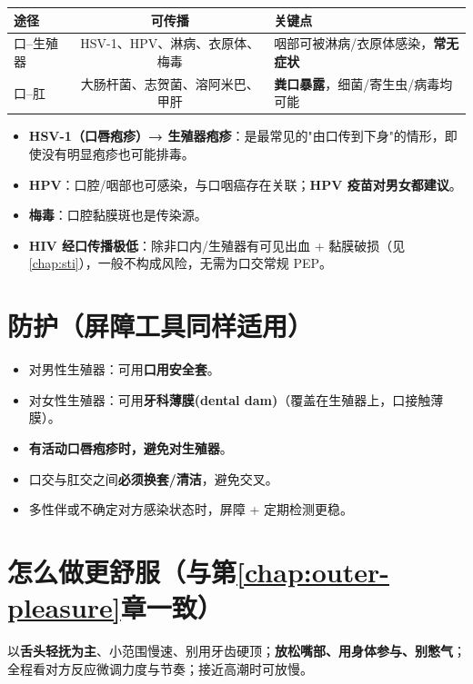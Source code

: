 \documentclass[12pt,UTF8,openany]{ctexbook}
\begin{document}
\begin{tabularx}{\textwidth}{lC X}
\toprule
途径 & 可传播 & 关键点 \\
\midrule
口--生殖器 & HSV-1、HPV、淋病、衣原体、梅毒 & 咽部可被淋病/衣原体感染，\textbf{常无症状} \\
口--肛 & 大肠杆菌、志贺菌、溶阿米巴、甲肝 & \textbf{粪口暴露}，细菌/寄生虫/病毒均可能 \\
\bottomrule
\end{tabularx}

\vspace{0.5em}
\begin{itemize}[leftmargin=2em,itemsep=0.3em]
  \item \textbf{HSV-1（口唇疱疹）→ 生殖器疱疹}：是最常见的"由口传到下身"的情形，即使没有明显疱疹也可能排毒。
  \item \textbf{HPV}：口腔/咽部也可感染，与口咽癌存在关联；\textbf{HPV 疫苗对男女都建议}。
  \item \textbf{梅毒}：口腔黏膜斑也是传染源。
  \item \textbf{HIV 经口传播极低}：除非口内/生殖器有可见出血 + 黏膜破损（见\ref{chap:sti}），一般不构成风险，无需为口交常规 PEP。
\end{itemize}

\section{防护（屏障工具同样适用）}

\begin{itemize}[leftmargin=2em,itemsep=0.3em]
  \item 对男性生殖器：可用\textbf{口用安全套}。
  \item 对女性生殖器：可用\textbf{牙科薄膜(dental dam)}（覆盖在生殖器上，口接触薄膜）。
  \item \textbf{有活动口唇疱疹时，避免对生殖器}。
  \item 口交与肛交之间\textbf{必须换套/清洁}，避免交叉。
  \item 多性伴或不确定对方感染状态时，屏障 + 定期检测更稳。
\end{itemize}

\section{怎么做更舒服（与第\ref{chap:outer-pleasure}章一致）}

以\textbf{舌头轻抚为主}、小范围慢速、别用牙齿硬顶；\textbf{放松嘴部、用身体参与、别憋气}；全程看对方反应微调力度与节奏；接近高潮时可放慢。
\end{document}
